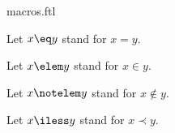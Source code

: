 \documentclass{naproche-library}
\begin{document}
\begin{smodule}[title=Macros]{macros.ftl}

\begin{forthel}
  Let $x \eq y$ stand for $x = y$.

  Let $x \elem y$ stand for $x \in y$.

  Let $x \notelem y$ stand for $x \notin y$.

  Let $x \iless y$ stand for $x \prec y$.
\end{forthel}
\end{smodule}
\end{document}
